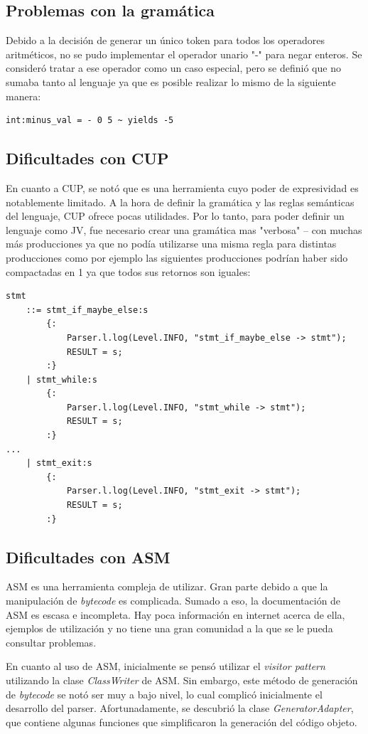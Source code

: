 \documentclass{article}
\begin{document}
        \subsection{Problemas con la gramática}
            \par Debido a la decisión de generar un único token para todos los operadores aritméticos, no se pudo implementar el operador unario "-" para negar enteros. Se consideró tratar a ese operador como un caso especial, pero se definió que no sumaba tanto al lenguaje ya que es posible realizar lo mismo de la siguiente manera:
            \begin{lstlisting}
int:minus_val = - 0 5 ~ yields -5
            \end{lstlisting} 

        \subsection{Dificultades con CUP}
            \par En cuanto a CUP, se notó que es una herramienta cuyo poder de expresividad es notablemente limitado. A la hora de definir la gramática y las reglas semánticas del lenguaje, CUP ofrece pocas utilidades. Por lo tanto, para poder definir un lenguaje como JV, fue necesario crear una gramática mas "verbosa" – con muchas más producciones ya que no podía utilizarse una misma regla para distintas producciones como por ejemplo las siguientes producciones podrían haber sido compactadas en 1 ya que todos sus retornos son iguales:
            \begin{lstlisting}
stmt
	::= stmt_if_maybe_else:s
		{:
			Parser.l.log(Level.INFO, "stmt_if_maybe_else -> stmt");
			RESULT = s;
		:}
	| stmt_while:s
		{:
			Parser.l.log(Level.INFO, "stmt_while -> stmt");
			RESULT = s;
		:}
...
	| stmt_exit:s
		{:
			Parser.l.log(Level.INFO, "stmt_exit -> stmt");
			RESULT = s;
		:}
            \end{lstlisting}

        \subsection{Dificultades con ASM}
            \par ASM es una herramienta compleja de utilizar. Gran parte debido a que la manipulación de \textit{bytecode} es complicada. Sumado a eso, la documentación de ASM es escasa e incompleta. Hay poca información en internet acerca de ella, ejemplos de utilización y no tiene una gran comunidad a la que se le pueda consultar problemas.
            \par En cuanto al uso de ASM, inicialmente se pensó utilizar el \textit{visitor pattern} utilizando la clase \textit{ClassWriter} de ASM. Sin embargo, este método de generación de \textit{bytecode} se notó ser muy a bajo nivel, lo cual complicó inicialmente el desarrollo del parser. Afortunadamente, se descubrió la clase \textit{GeneratorAdapter}, que contiene algunas funciones que simplificaron la generación del código objeto.
\end{document}
